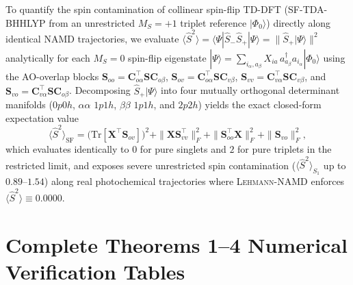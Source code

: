 \documentclass[10pt]{article}
\theoremstyle{natthm}
\newcommand{\leh}{\textsc{Lehmann-NAMD}}
\newcommand{\Ssq}{\langle\hat{S}^2\rangle}
\begin{document}
To quantify the spin contamination of collinear spin-flip TD-DFT (SF-TDA-BHHLYP from an unrestricted $M_S = +1$ triplet reference $|\Phi_0\rangle$) directly along identical NAMD trajectories, we evaluate $\Ssq = \langle\Psi|\hat{S}_-\hat{S}_+|\Psi\rangle = \|\hat{S}_+|\Psi\rangle\|^2$ analytically for each $M_S=0$ spin-flip eigenstate $|\Psi\rangle = \sum_{i_\alpha, a_\beta} X_{ia}\,a^\dagger_{a_\beta}a_{i_\alpha}|\Phi_0\rangle$ using the AO-overlap blocks $\mathbf{S}_{oo} = \mathbf{C}_{o\alpha}^\top\mathbf{S}\mathbf{C}_{o\beta}$, $\mathbf{S}_{ov} = \mathbf{C}_{o\alpha}^\top\mathbf{S}\mathbf{C}_{v\beta}$, $\mathbf{S}_{vv} = \mathbf{C}_{v\alpha}^\top\mathbf{S}\mathbf{C}_{v\beta}$, and $\mathbf{S}_{vo} = \mathbf{C}_{v\alpha}^\top\mathbf{S}\mathbf{C}_{o\beta}$.
Decomposing $\hat{S}_+|\Psi\rangle$ into four mutually orthogonal determinant manifolds ($0p0h$, $\alpha\alpha$ $1p1h$, $\beta\beta$ $1p1h$, and $2p2h$) yields the exact closed-form expectation value
\begin{equation}
  \Ssq_{\mathrm{SF}} = \bigl(\mathrm{Tr}[\mathbf{X}^\top\mathbf{S}_{ov}]\bigr)^2
                     + \|\mathbf{X}\mathbf{S}_{vv}^\top\|_F^2
                     + \|\mathbf{S}_{oo}^\top\mathbf{X}\|_F^2
                     + \|\mathbf{S}_{vo}\|_F^2,
\end{equation}
which evaluates identically to $0$ for pure singlets and $2$ for pure triplets in the restricted limit, and exposes severe unrestricted spin contamination ($\Ssq_{S_1}$ up to $0.89$--$1.54$) along real photochemical trajectories where \leh{} enforces $\Ssq \equiv 0.0000$.

\section{Complete Theorems 1--4 Numerical Verification Tables}

\begin{table}[htbp]
  \centering
  \caption{Theorem 1 live float64 verification of exact Dyson residue $Z_n$ and Generalized Causal Hellmann--Feynman identities on distorted twisted-pyramidalized ethylene (DF-PBE0/def2-SVP).}
  \label{tab:si_th1}
\end{table}
\end{document}
